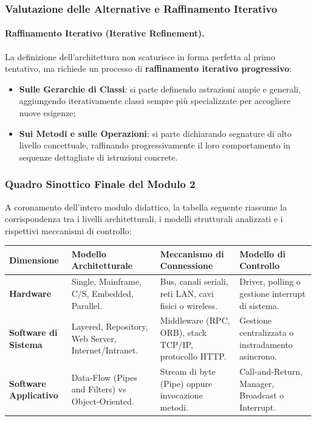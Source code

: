 \documentclass[12pt]{extarticle}
\begin{document}
\subsubsection{Valutazione delle Alternative e Raffinamento Iterativo}

\paragraph{Raffinamento Iterativo (Iterative Refinement).}
La definizione dell'architettura non scaturisce in forma perfetta al primo tentativo, ma richiede un processo di \textbf{raffinamento iterativo progressivo}:
\begin{itemize}
    \item \textbf{Sulle Gerarchie di Classi}: si parte definendo astrazioni ampie e generali, aggiungendo iterativamente classi sempre più specializzate per accogliere nuove esigenze;
    \item \textbf{Sui Metodi e sulle Operazioni}: si parte dichiarando segnature di alto livello concettuale, raffinando progressivamente il loro comportamento in sequenze dettagliate di istruzioni concrete.
\end{itemize}

\subsubsection{Quadro Sinottico Finale del Modulo 2}

\noindent A coronamento dell'intero modulo didattico, la tabella seguente riassume la corrispondenza tra i livelli architetturali, i modelli strutturali analizzati e i rispettivi meccanismi di controllo:

\begin{center}
\small
\begin{tabular}{p{2.6cm}p{3.8cm}p{4.2cm}p{3.2cm}}
    \toprule
    \textbf{Dimensione} & \textbf{Modello Architetturale} & \textbf{Meccanismo di Connessione} & \textbf{Modello di Controllo} \\
    \midrule
    \textbf{Hardware} & Single, Mainframe, C/S, Embedded, Parallel. & Bus, canali seriali, reti LAN, cavi fisici o wireless. & Driver, polling o gestione interrupt di sistema. \\
    \addlinespace
    \textbf{Software di Sistema} & Layered, Repository, Web Server, Internet/Intranet. & Middleware (RPC, ORB), stack TCP/IP, protocollo HTTP. & Gestione centralizzata o instradamento asincrono. \\
    \addlinespace
    \textbf{Software Applicativo} & Data-Flow (Pipes and Filters) vs Object-Oriented. & Stream di byte (Pipe) oppure invocazione metodi. & Call-and-Return, Manager, Broadcast o Interrupt. \\
    \bottomrule
\end{tabular}
\end{center}
\end{document}
